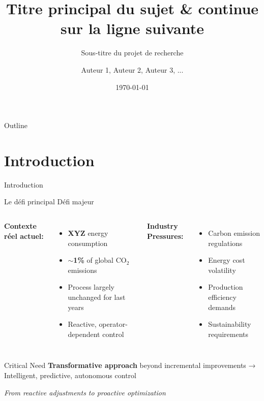 \documentclass[aspectratio=169]{beamer}
\title{Titre principal du sujet \& continue sur la ligne suivante}
\subtitle{Sous-titre du projet de recherche}
\author{Auteur 1, Auteur 2, Auteur 3, ...}
\institute{Université du Québec à Chicoutimi \& Partenaire industriel}
\date{\today}
\begin{document}
\begin{frame}
\titlepage
\end{frame}

\begin{frame}{Outline}
\tableofcontents
\end{frame}

\section{Introduction}

\begin{frame}{Introduction}
\begin{block}{Le défi principal}
Défi majeur
\end{block}

\begin{columns}[t]
\textbf{Contexte réel actuel:}
\begin{itemize}
    \item \textcolor{accent2}{\textbf{XYZ}} energy consumption
    \item \textcolor{accent2}{\textbf{$\sim$1\%}} of global CO$_2$ emissions
    \item Process largely unchanged for last years
    \item Reactive, operator-dependent control
\end{itemize}

\textbf{Industry Pressures:}
\begin{itemize}
    \item Carbon emission regulations
    \item Energy cost volatility
    \item Production efficiency demands
    \item Sustainability requirements
\end{itemize}
\end{columns}

\vspace{0.3cm}
\begin{alertblock}{Critical Need}
\textbf{Transformative approach} beyond incremental improvements → Intelligent, predictive, autonomous control
\end{alertblock}

\vspace{0.2cm}
\begin{center}
\textit{From reactive adjustments to proactive optimization}
\end{center}
\end{frame}
\end{document}
